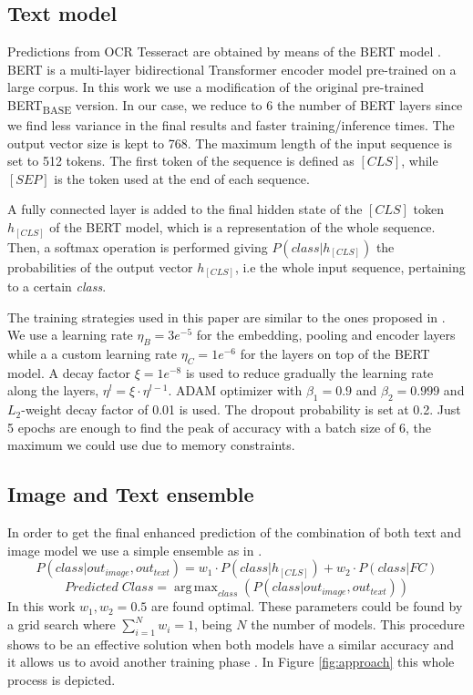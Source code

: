 \documentclass[runningheads]{llncs}
\DeclareMathOperator*{\argmax}{arg\,max}
\begin{document}
\subsection{Text model}
Predictions from OCR Tesseract \cite{tesseract} are obtained by means of the BERT model \cite{BERT}. BERT is a multi-layer bidirectional Transformer encoder model pre-trained on a large corpus. In this work we use a modification of the original pre-trained BERT\textsubscript{BASE} version. In our case, we reduce to 6 the number of BERT layers since we find less variance in the final results and faster training/inference times. The output vector size is kept to 768. The maximum length of the input sequence is set to 512 tokens. The first token of the sequence is defined as $[CLS]$, while $[SEP]$ is the token used at the end of each sequence.

A fully connected layer is added to the final hidden state of the $[CLS]$ token $h_{[CLS]}$ of the BERT model, which is a representation of the whole sequence. Then, a softmax operation is performed giving $P(class|h_{[CLS]})$ the probabilities of the output vector $h_{[CLS]}$, i.e the whole input sequence, pertaining to a certain \textit{class}.


The training strategies used in this paper are similar to the ones proposed in \cite{tune_bert,classification_bert}. We use a learning rate $\eta_{B} = 3e^{-5}$ for the embedding, pooling and encoder layers while a a custom learning rate $\eta_{C}=1e^{-6}$ for the layers on top of the BERT model. A decay factor $\xi = 1e^{-8}$ is used to reduce gradually the learning rate along the layers, $\eta^{l}= \xi \cdot \eta^{l-1}$. ADAM optimizer with $\beta_1 = 0.9$ and $\beta_2 = 0.999$ and $L_{2}$-weight decay factor of 0.01 is used. The dropout probability is set at 0.2. Just 5 epochs are enough to find the peak of accuracy with a batch size of 6, the maximum we could use due to memory constraints.

\subsection{Image and Text ensemble}\label{ensemble}

In order to get the final enhanced prediction of the combination of both text and image model we use a simple ensemble as in \cite{stream}.
\[
 P(class|out_{image},out_{text}) = w_{1} \cdot P(class|h_{[CLS]}) + w_{2} \cdot P(class|FC)
\]
\[
Predicted\;Class = \argmax_{class}(P(class|out_{image},out_{text}))
\]
In this work $w_{1},w_{2} = 0.5$ are found optimal. These parameters could be found by a grid search where $\sum_{i=1}^{N}w_{i} = 1$, being $N$ the number of models. This procedure shows to be an effective solution when both models have a similar accuracy and it allows us to avoid another training phase \cite{multimodal}. In Figure \ref{fig:approach} this whole process is depicted.
\end{document}
